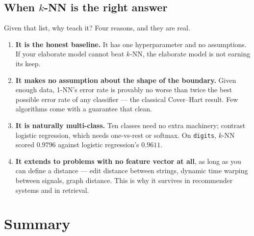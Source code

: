 \documentclass[11pt]{article}
\begin{document}
\subsection{When $k$-NN is the right answer}

Given that list, why teach it? Four reasons, and they are real.

\begin{enumerate}[leftmargin=*]
  \item \textbf{It is the honest baseline.} It has one hyperparameter and no
    assumptions. If your elaborate model cannot beat $k$-NN, the elaborate
    model is not earning its keep.
  \item \textbf{It makes no assumption about the shape of the boundary.} Given
    enough data, 1-NN's error rate is provably no worse than twice the best
    possible error rate of any classifier --- the classical Cover--Hart result.
    Few algorithms come with a guarantee that clean.
  \item \textbf{It is naturally multi-class.} Ten classes need no extra
    machinery; contrast logistic regression, which needs one-vs-rest or
    softmax. On \texttt{digits}, $k$-NN scored $0.9796$ against logistic
    regression's $0.9611$.
  \item \textbf{It extends to problems with no feature vector at all}, as long
    as you can define a distance --- edit distance between strings, dynamic time
    warping between signals, graph distance. This is why it survives in
    recommender systems and in retrieval.
\end{enumerate}

\section{Summary}
\label{sec:summary}
\end{document}
